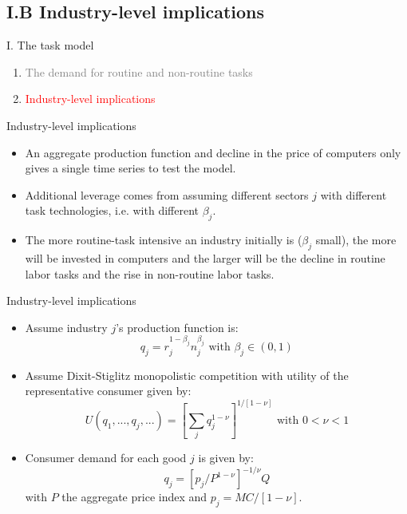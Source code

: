 \documentclass[notes=show]{beamer}
\begin{document}
\subsection{I.B Industry-level implications}

\begin{frame}{I. The task model}
\begin{enumerate}
\item[\textcolor{gray}{I.A}] \textcolor{gray}{The demand for routine and non-routine tasks} \bigskip
\item[\textcolor{red}{I.B}] \textcolor{red}{Industry-level implications}
\end{enumerate}
\end{frame}

\begin{frame}{Industry-level implications}
\begin{itemize}
\item An aggregate production function and decline in the price of computers only gives a single time series to test the model. \medskip
\item Additional leverage comes from assuming different sectors $j$ with different task technologies, i.e. with different $ \beta_{j}$. \medskip
\item The more routine-task intensive an industry initially is ($ \beta_{j}$ small), the more will be invested in computers and the larger will be the decline in routine labor tasks and the rise in non-routine labor tasks.
\end{itemize}
\end{frame}

\begin{frame}{Industry-level implications}
\begin{itemize}
\item Assume industry $j$'s production function is:
\[
q_{j} = r_{j}^{1- \beta_{j}} n_{j}^{ \beta_{j}} \text{ with } \beta_{j} \in (0,1) \tag{8}  \label{eq8}
\]
\item Assume Dixit-Stiglitz monopolistic competition with utility of the representative consumer given by:
\[
U(q_{1},...,q_{j},...) = [ \sum_{j} q_{j}^{1- \nu}]^{1/[1- \nu]} \text{ with } 0 < \nu <1  \tag{9}  \label{eq9}
\]
\item Consumer demand for each good $j$ is given by:
\[
q_{j} = [p_{j}/P^{1 - \nu}]^{-1/ \nu} Q
\]
with $P$ the aggregate price index and $p_{j} = MC/[1 - \nu ]$. 
\end{itemize}
\end{frame}
\end{document}
